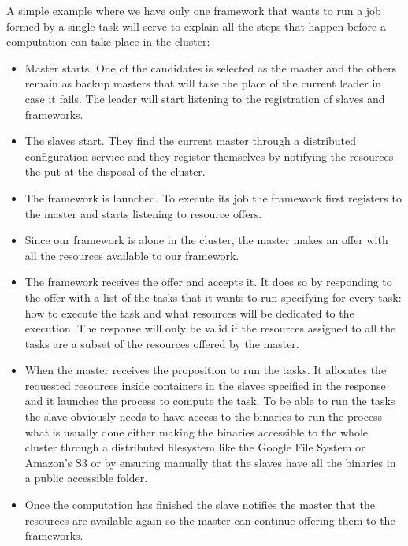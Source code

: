 \documentclass{report}                     %
\begin{document}
A simple example where we have only one framework that wants to run a 
job formed by a single task will serve to explain all the steps that happen
before a computation can take place in the cluster:

\begin{itemize}
\item Master starts. One of the candidates is selected as the master and 
the others remain as backup masters that will take the place of the current leader in
case it fails. The leader will start listening to the registration of slaves and 
frameworks.
\item The slaves start. They find the current master through a distributed configuration 
service and they register themselves by notifying the resources the put at the disposal
of the cluster.
\item The framework is launched. To execute its job the framework
  first registers to the master and starts listening to resource
  offers.
\item Since our framework is alone in the cluster, the master makes an offer with
all the resources available to our framework.
\item The framework receives the offer and accepts it. It does so by responding to the
offer with a list of the tasks that it wants to run specifying for every task: how to 
execute the task and what resources will be dedicated to the execution.
The response will only be valid if the resources assigned to all the tasks are a subset
of the resources offered by the master.
\item When the master receives the proposition to run the tasks. It
  allocates the requested resources inside containers in the slaves
  specified in the response and it launches the process to compute the
  task. To be able to run the tasks the slave obviously needs to have
  access to the binaries to run the process what is usually done
  either making the binaries accessible to the whole cluster through a
  distributed filesystem like the Google File System
  \cite{ghemawat_google_2003} or Amazon's S3 \cite{_aws_????} or by
  ensuring manually that the slaves have all the binaries in a public
  accessible folder.
\item Once the computation has finished the slave notifies the master that the resources
are available again so the master can continue offering them to the frameworks.
\end{itemize}

\end{document}
